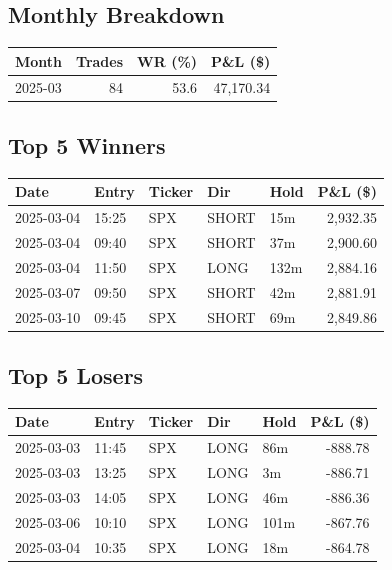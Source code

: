 \documentclass[11pt,a4paper]{article}
\begin{document}
\subsection*{Monthly Breakdown}
\noindent\begin{center}
\begin{tabular}{>{\color{txtmain}}l rrr}
\toprule
\rowcolor{cardbg}
\textbf{Month} & \textbf{Trades} & \textbf{WR (\%)} & \textbf{P\&L (\$)} \\
\midrule
2025-03 & 84 & 53.6 & \textcolor{wingreen}{47,170.34} \\
\bottomrule
\end{tabular}
\end{center}
\subsection*{Top 5 Winners}
\noindent\begin{center}
\begin{tabular}{>{\color{txtmain}}l llll r}
\toprule
\rowcolor{cardbg}
\textbf{Date} & \textbf{Entry} & \textbf{Ticker} & \textbf{Dir} & \textbf{Hold} & \textbf{P\&L (\$)} \\
\midrule
2025-03-04 & 15:25 & SPX & SHORT & 15m & \textcolor{wingreen}{2,932.35} \\
2025-03-04 & 09:40 & SPX & SHORT & 37m & \textcolor{wingreen}{2,900.60} \\
2025-03-04 & 11:50 & SPX & LONG & 132m & \textcolor{wingreen}{2,884.16} \\
2025-03-07 & 09:50 & SPX & SHORT & 42m & \textcolor{wingreen}{2,881.91} \\
2025-03-10 & 09:45 & SPX & SHORT & 69m & \textcolor{wingreen}{2,849.86} \\
\bottomrule
\end{tabular}
\end{center}
\subsection*{Top 5 Losers}
\noindent\begin{center}
\begin{tabular}{>{\color{txtmain}}l llll r}
\toprule
\rowcolor{cardbg}
\textbf{Date} & \textbf{Entry} & \textbf{Ticker} & \textbf{Dir} & \textbf{Hold} & \textbf{P\&L (\$)} \\
\midrule
2025-03-03 & 11:45 & SPX & LONG & 86m & \textcolor{lossred}{-888.78} \\
2025-03-03 & 13:25 & SPX & LONG & 3m & \textcolor{lossred}{-886.71} \\
2025-03-03 & 14:05 & SPX & LONG & 46m & \textcolor{lossred}{-886.36} \\
2025-03-06 & 10:10 & SPX & LONG & 101m & \textcolor{lossred}{-867.76} \\
2025-03-04 & 10:35 & SPX & LONG & 18m & \textcolor{lossred}{-864.78} \\
\bottomrule
\end{tabular}
\end{center}
\clearpage
\end{document}
